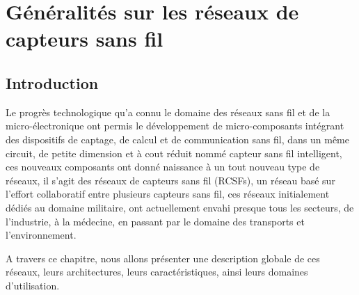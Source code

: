 


\chapter{Généralités sur les réseaux de capteurs sans fil}
\section{Introduction}
        Le progrès technologique qu'a connu le domaine des réseaux sans fil et de la micro-électronique ont permis le développement de micro-composants intégrant des dispositifs de captage, de calcul et de communication sans fil, dans un même circuit, de petite dimension et à cout réduit nommé capteur sans fil intelligent, ces nouveaux composants  ont donné naissance à un tout nouveau type de réseaux, il s'agit des réseaux de capteurs sans fil (RCSFs), un réseau basé sur l'effort collaboratif entre plusieurs capteurs sans fil, ces réseaux initialement dédiés au domaine militaire, ont actuellement envahi presque tous les secteurs,  de l'industrie, à la médecine, en passant par le domaine des transports et l'environnement.
        
        
     A travers ce chapitre, nous allons présenter une description globale de ces réseaux, leurs architectures, leurs caractéristiques, ainsi leurs domaines d'utilisation.
        
